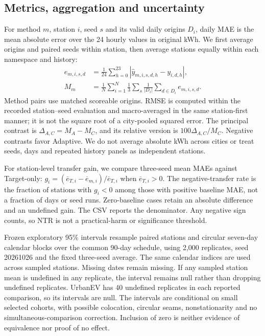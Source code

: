 \documentclass[pdflatex,iicol,sn-mathphys-num]{sn-jnl}
\begin{document}
\subsection{Metrics, aggregation and uncertainty}\label{sec:metrics}
For method $m$, station $i$, seed $s$ and its valid daily origins $D_i$, daily MAE is the mean absolute error over the 24 hourly values in original kWh. We first average origins and paired seeds within station, then average stations equally within each namespace and history:
\begin{equation}
 \begin{aligned}e_{m,i,s,d}&=\frac{1}{24}\sum_{h=0}^{23}|\widehat y_{m,i,s,d,h}-y_{i,d,h}|,\\ M_m&=\frac{1}{N}\sum_{i=1}^N\frac{1}{3}\sum_{s}\frac{1}{|D_i|}\sum_{d\in D_i}e_{m,i,s,d}.\end{aligned}\label{eq:macro}
\end{equation}
Method pairs use matched scoreable origins. RMSE is computed within the recorded station--seed evaluation and macro-averaged in the same station-first manner; it is not the square root of a city-pooled squared error. The principal contrast is $\Delta_{A,C}=M_A-M_C$, and its relative version is $100\Delta_{A,C}/M_C$. Negative contrasts favor Adaptive. We do not average absolute kWh across cities or treat seeds, days and repeated history panels as independent stations.

For station-level transfer gain, we compare three-seed mean MAEs against Target-only: $g_i=(\overline e_{T,i}-\overline e_{m,i})/\overline e_{T,i}$ when $\overline e_{T,i}>0$. The negative-transfer rate is the fraction of stations with $g_i<0$ among those with positive baseline MAE, not a fraction of days or seed runs. Zero-baseline cases retain an absolute difference and an undefined gain. The CSV reports the denominator. Any negative sign counts, so NTR is not a practical-harm or significance threshold.

Frozen exploratory 95\% intervals resample paired stations and circular seven-day calendar blocks over the common 90-day schedule, using 2,000 replicates, seed 20261026 and the fixed three-seed average. The same calendar indices are used across sampled stations. Missing dates remain missing. If any sampled station mean is undefined in any replicate, the interval remains null rather than dropping undefined replicates. UrbanEV has 40 undefined replicates in each reported comparison, so its intervals are null. The intervals are conditional on small selected cohorts, with possible colocation, circular seams, nonstationarity and no simultaneous-comparison correction. Inclusion of zero is neither evidence of equivalence nor proof of no effect.
\end{document}
